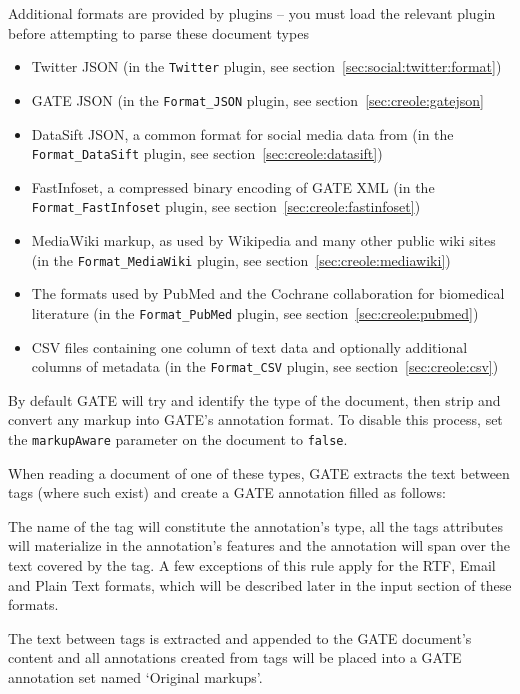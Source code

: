 Additional formats are provided by plugins -- you must load the relevant
plugin before attempting to parse these document types
\begin{itemize}
\item Twitter JSON (in the {\tt Twitter} plugin, see
  section~\ref{sec:social:twitter:format})
\item GATE JSON (in the {\tt Format\_JSON} plugin, see
  section~\ref{sec:creole:gatejson}
\item DataSift JSON, a common format for social media data from
   (in the {\tt Format\_DataSift} plugin, see
  section~\ref{sec:creole:datasift})
\item FastInfoset, a compressed binary encoding of GATE XML (in the
  {\tt Format\_FastInfoset} plugin, see section~\ref{sec:creole:fastinfoset})
\item MediaWiki markup, as used by Wikipedia and many other public wiki sites
  (in the {\tt Format\_MediaWiki} plugin, see
  section~\ref{sec:creole:mediawiki})
\item The formats used by PubMed and the Cochrane collaboration for biomedical
  literature (in the {\tt Format\_PubMed} plugin, see
  section~\ref{sec:creole:pubmed})
\item CSV files containing one column of text data and optionally additional
  columns of metadata (in the {\tt Format\_CSV} plugin, see
  section~\ref{sec:creole:csv})
\end{itemize}

By default GATE will try and identify the type of the document, then strip
and convert any markup into GATE's annotation format. To disable this
process, set the {\tt markupAware} parameter on the document to {\tt false}.

When reading a document of one of these types, GATE extracts the text
between tags (where such exist)
and create a GATE annotation filled as follows:

The name of the tag will constitute the annotation's type, all the
tags attributes will materialize in the annotation's features and
the annotation will span over the text covered by the tag. A few
exceptions of this rule apply for the RTF, Email and Plain Text
formats, which will be described later in the input section of
these formats.

The text between tags is extracted and appended to the GATE
document's content and all annotations created from tags will be
placed into a GATE annotation set named `Original markups'.

